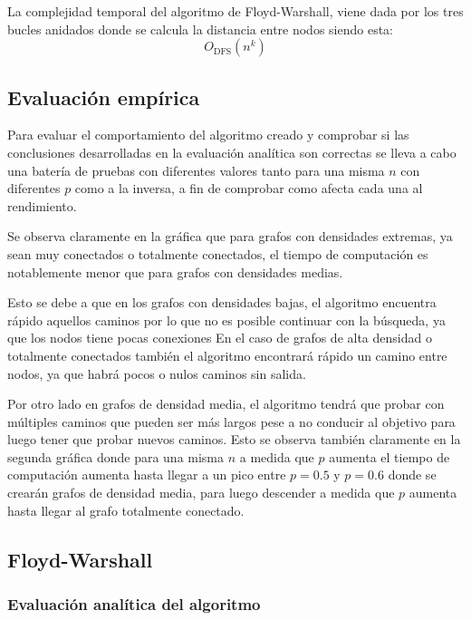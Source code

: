 La complejidad temporal del algoritmo de Floyd-Warshall, viene dada por los tres bucles anidados donde se calcula la distancia entre nodos  siendo esta:
\begin{equation}
    O_{\mathrm{DFS}}(n^k) 
\end{equation}

\subsection*{Evaluación empírica}

Para evaluar el comportamiento del algoritmo creado y comprobar si las conclusiones desarrolladas en la evaluación analítica son correctas se lleva a cabo una batería de pruebas con diferentes valores tanto para una misma $n$ con diferentes $p$ como a la inversa, a fin de comprobar como afecta cada una al rendimiento.


Se observa claramente en la gráfica que para grafos con densidades extremas, ya sean muy conectados o totalmente conectados, el tiempo de computación es notablemente menor que para grafos con densidades medias.

Esto se debe a que en los grafos con densidades bajas, el algoritmo encuentra rápido aquellos caminos por lo que no es posible continuar con la búsqueda, ya que los nodos tiene pocas conexiones  En el caso de grafos de alta densidad o totalmente conectados también el algoritmo encontrará rápido un camino entre nodos, ya que habrá pocos o nulos caminos sin salida.

Por otro lado en grafos de densidad media, el algoritmo tendrá que probar con múltiples caminos que pueden ser más largos pese a no conducir al objetivo para luego tener que probar nuevos caminos.
Esto se observa también claramente en la segunda gráfica donde para una misma $n$ a medida que $p$ aumenta el tiempo de computación aumenta hasta llegar a un pico entre $p=0.5$ y $p=0.6$ donde se crearán grafos de densidad media, para luego descender a medida que $p$ aumenta hasta llegar al grafo totalmente conectado.



\subsection{Floyd-Warshall}\label{subsec:fw}

\subsubsection*{Evaluación analítica del algoritmo}

